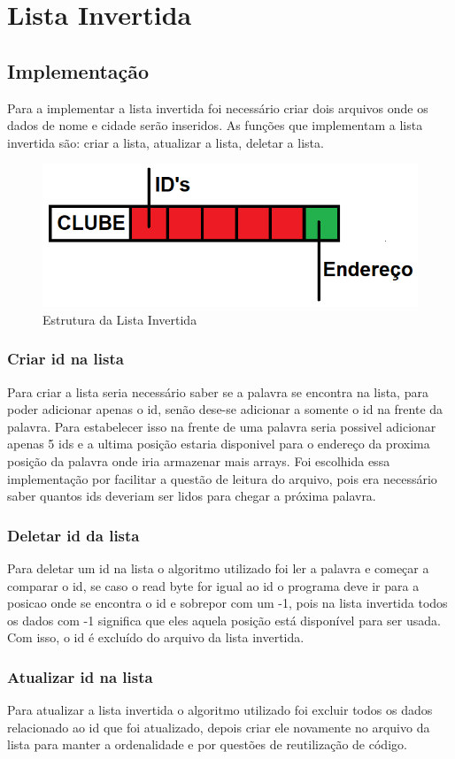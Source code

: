 \documentclass[12pt]{article}
\begin{document}
\section{Lista Invertida}
\subsection{Implementação}
Para a implementar a lista invertida foi necessário criar dois arquivos onde os dados de nome e cidade serão inseridos. As funções que implementam a lista invertida são: criar a lista, atualizar a lista, deletar a lista.

\begin{figure}[ht]
\centering
\includegraphics[width=.4\textwidth]{lista.png}
\caption{Estrutura da Lista Invertida}
\label{fig:create1}
\end{figure}

\subsubsection{Criar id na lista}
Para criar a lista seria necessário saber se a palavra se encontra na lista, para poder adicionar apenas o id, senão dese-se adicionar a somente o id na frente da palavra. Para estabelecer isso na frente de uma palavra seria possivel adicionar apenas 5 ids e a ultima posição estaria disponivel para o endereço da proxima posição da palavra onde iria armazenar mais arrays. Foi escolhida essa implementação por facilitar a questão de leitura do arquivo, pois era necessário saber quantos ids deveriam ser lidos para chegar a próxima palavra.

\subsubsection{Deletar id da lista}
Para deletar um id na lista o algoritmo utilizado foi ler a palavra e começar a comparar o id, se caso o read byte for igual ao id o programa deve ir para a posicao onde se encontra o id e sobrepor com um -1, pois na lista invertida todos os dados com -1 significa que eles aquela posição está disponível para ser usada. Com isso, o id é excluído do arquivo da lista invertida.

\subsubsection{Atualizar id na lista}
Para atualizar a lista invertida o algoritmo utilizado foi excluir todos os dados relacionado ao id que foi atualizado, depois criar ele novamente no arquivo da lista para manter a ordenalidade e por questões de reutilização de código.
\end{document}
